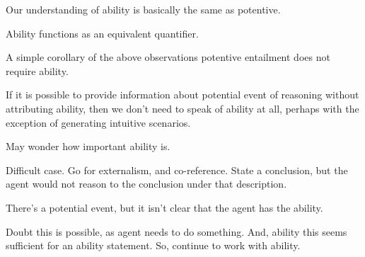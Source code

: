 \begin{note}[Ability]
  Our understanding of ability is basically the same as potentive.

  Ability functions as an equivalent quantifier.
\end{note}

\begin{note}
  A simple corollary of the above observations potentive entailment does not require ability.

  If it is possible to provide information about potential event of reasoning without attributing ability, then we don't need to speak of ability at all, perhaps with the exception of generating intuitive scenarios.

  May wonder how important ability is.

  Difficult case.
  Go for externalism, and co-reference.
  State a conclusion, but the agent would not reason to the conclusion under that description.

  There's a potential event, but it isn't clear that the agent has the ability.

  Doubt this is possible, as agent needs to do something.
  And, ability this seems sufficient for an ability statement.
  So, continue to work with ability.
\end{note}

